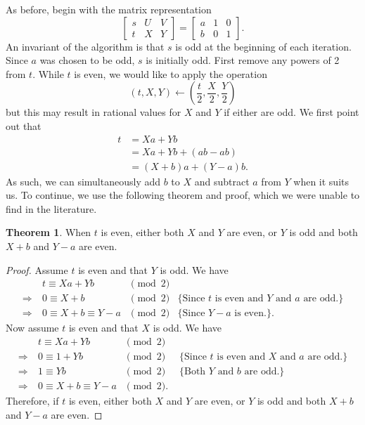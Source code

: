 \documentclass{ucalgthes1}
\theoremstyle{definition}
\newtheorem{thm}{Theorem}[section]
\newcommand{\matrixThreeTwo}[6]{\left[ \begin{array}{rrr} #1 & #2 & #3 \\ #4 & #5 & #6 \end{array} \right]}
\begin{document}
As before, begin with the matrix representation
\[
	\matrixThreeTwo{s}{U}{V}{t}{X}{Y} = \matrixThreeTwo{a}{1}{0}{b}{0}{1}.
\]
An invariant of the algorithm is that $s$ is odd at the beginning of each iteration.  Since $a$ was chosen to be odd, $s$ is initially odd.  First remove any powers of 2 from $t$.  While $t$ is even, we would like to apply the operation
\[
(t, X, Y) \gets \left( \frac{t}{2}, \frac{X}{2}, \frac{Y}{2} \right)
\]
but this may result in rational values for $X$ and $Y$ if either are odd. We first point out that
\begin{align*}
	t &= Xa + Yb \\
	  &= Xa + Yb + (ab - ab) \\
	  &= (X+b)a + (Y-a)b.
\end{align*}
As such, we can simultaneously add $b$ to $X$ and subtract $a$ from $Y$ when it suits us.  To continue, we use the following theorem and proof, which we were unable to find in the literature.

\begin{thm}
\label{thm:addBSubA}
When $t$ is even, either both $X$ and $Y$ are even, or $Y$ is odd and both $X+b$ and $Y-a$ are even.
\end{thm}

\begin{proof}
Assume $t$ is even and that $Y$ is odd.  We have
\[
\begin{array}{rllr}
	         & t \equiv Xa + Yb & \pmod 2 \\
\Rightarrow~ & 0 \equiv X + b & \pmod 2 & \textrm{\{Since $t$ is even and $Y$ and $a$ are odd.\}} \\
\Rightarrow~ & 0 \equiv X + b \equiv Y - a & \pmod 2 & \textrm{\{Since $Y-a$ is even.\}}. 
\end{array}
\]
Now assume $t$ is even and that $X$ is odd.  We have
\[
\begin{array}{rllr}
	         & t \equiv Xa + Yb & \pmod 2 \\
\Rightarrow~ & 0 \equiv 1 + Yb & \pmod 2 & \textrm{ \{Since $t$ is even and $X$ and $a$ are odd.\}} \\
\Rightarrow~ & 1 \equiv Yb & \pmod 2 & \textrm{ \{Both $Y$ and $b$ are odd.\}} \\
\Rightarrow~ & 0 \equiv X + b \equiv Y - a & \pmod 2. 
\end{array}
\]
Therefore, if $t$ is even, either both $X$ and $Y$ are even, or $Y$ is odd and both $X+b$ and $Y-a$ are even.
\end{proof}
\end{document}

